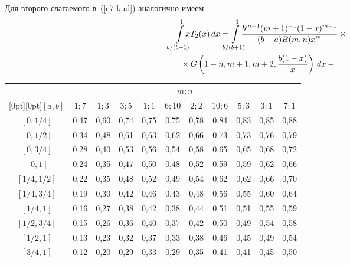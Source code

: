 \begin{multicols}{2}
Для второго слагаемого в~(\ref{e7-kud}) аналогично имеем
\begin{multline*}
\il{b/(b+1)}{1}\hspace*{-3mm} xT_{2}(x)\, dx =\hspace*{-3mm}
\il{b/(b+1)}{1} \hspace*{-3mm}\fr{ b^{m+1}(m+1)^{-1} (1-x)^{m-1}}{(b - a) B(m,n)x^{m}}\times{}\\
{}\times
G\left(1-n,m+1,m+2, \fr{b(1 - x)}{x} \right)\,dx -{}
\end{multline*}

\end{multicols}

\begin{table*}[b]\small %
\begin{center}
\vspace*{2ex}

\begin{tabular}{|c|c|c|c|c|c|c|c|c|c|c|}
 \hline
 &\multicolumn{10}{c|}{$m;n$}\\
 \cline{2-11}
 \multicolumn{1}{|c|}{\raisebox{6pt}[0pt][0pt]{$[a,b]$ }}&
  ${1; 7}$ & ${1; 3}$ & ${3; 5}$ &
  ${1; 1}$ & ${6; 10}$ & ${2; 2}$ &
  ${10; 6}$ & ${5; 3}$ & ${3; 1}$ & ${7; 1}$\\
 \hline
$[0,1/4]$&0,47&0,60&0,74&0,75&0,75&0,78&0,84&0,83&0,85&0,88\\
$[0,1/2]$&0,34&0,48&0,61&0,63&0,62&0,66&0,73&0,73&0,76&0,79\\
$[0,3/4]$&0,28&0,40&0,53&0,56&0,54&0,58&0,65&0,65&0,68&0,72\\
$[0,1]$&0,24&0,35&0,47&0,50&0,48&0,52&0,59&0,59&0,62&0,66\\
$[1/4,1/2]$&0,22&0,35&0,48&0,52&0,49&0,54&0,62&0,62&0,66&0,70\\
$[1/4,3/4]$&0,19&0,30&0,42&0,46&0,43&0,48&0,56&0,55&0,60&0,64\\
$[1/4,1]$&0,16&0,27&0,38&0,42&0,38&0,44&0,51&0,51&0,55&0,59\\
$[1/2,3/4]$&0,15&0,26&0,36&0,40&0,37&0,42&0,50&0,49&0,54&0,58\\
$[1/2,1]$&0,13&0,23&0,32&0,37&0,33&0,38&0,46&0,45&0,49&0,54\\
$[3/4,1]$&0,12&0,20&0,29&0,33&0,29&0,35&0,41&0,41&0,45&0,50\\
 \hline
 \end{tabular}
 \end{center}
\begin{center}
\vspace*{2ex}


\end{center}
\end{table*}
